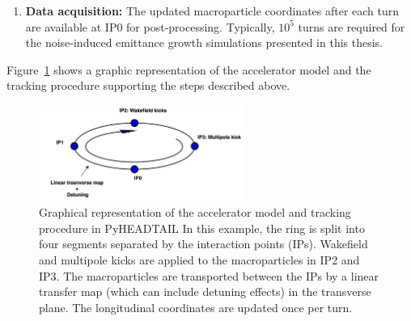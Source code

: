 {\begin{enumerate}
    
    The wake functions are available from the detailed impedance model of the machine, which is obtained from a combination of theoretical computations and electromagnetic simulations and can be imported in PyHEADTAIL in form of tables~\cite{pyheadtail_manual_adrian}. Typically, the impedance model of an accelerator is provided normalised with the average value of the horizontal and vertical beta functions over the machine at the respective plane. Therefore the transverse beta functions at the location where the wakefield kicks are applied on the beam must equal these average values.%
    
    \item \textbf{Data acquisition:} The updated macroparticle coordinates after each turn are available at IP0 for post-processing. Typically, $10^{5}$ turns are required for the noise-induced emittance growth simulations presented in this thesis. 
    
\end{enumerate}


Figure~\ref{fig:pyheadtail_accelerator_model} shows a graphic representation of the accelerator model and the tracking procedure supporting the steps described above.

\begin{figure}[!h]
    \centering         
    \includegraphics[width=0.6\textwidth]{images/Ch2/accelerator_model_graph_pyheadtail.png}
        \caption{Graphical representation of the accelerator model and tracking procedure in PyHEADTAIL %
        In this example, the ring is split into four segments separated by the interaction points (IPs). Wakefield and multipole kicks are applied to the macroparticles in IP2 and IP3. The macroparticles are transported between the IPs by a linear transfer map (which can include detuning effects) in the transverse plane.  The longitudinal coordinates are updated once per turn.}
        \label{fig:pyheadtail_accelerator_model}
 \end{figure}


}
